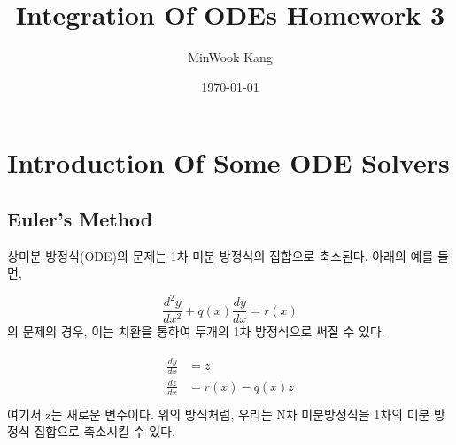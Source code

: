 \documentclass[11pt]{article}
\title{Integration Of ODEs Homework 3}
\author{MinWook Kang}
\date{\today}
\begin{document}
\maketitle
\pagebreak



\section{Introduction Of Some ODE Solvers}
\subsection{Euler's Method} 
상미분 방정식(ODE)의 문제는 1차 미분 방정식의 집합으로 축소된다. 아래의 예를 들면, 

\begin{equation}
\frac{d^2 y}{dx^2} + q(x) \frac{dy}{dx} = r(x)
\end{equation}
\noindent
의 문제의 경우, 이는 치환을 통하여 두개의 1차 방정식으로 써질 수 있다. 

\begin{equation}
\begin{split}
\begin{aligned}
\frac{dy}{dx} &= z \\
\frac{dz}{dx} &= r(x) - q(x) z \\
\end{aligned}
\end{split}
\end{equation}
\noindent
여기서 z는 새로운 변수이다. 위의 방식처럼, 우리는 N차 미분방정식을 1차의 미분 방정식 집합으로 축소시킬 수 있다.
\end{document}
